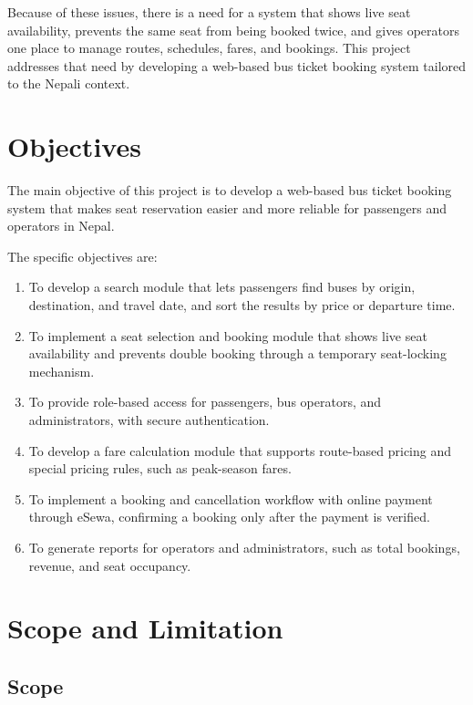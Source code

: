 Because of these issues, there is a need for a system that shows live seat availability, prevents the same seat from being booked twice, and gives operators one place to manage routes, schedules, fares, and bookings. This project addresses that need by developing a web-based bus ticket booking system tailored to the Nepali context.

\section{Objectives}

The main objective of this project is to develop a web-based bus ticket booking system that makes seat reservation easier and more reliable for passengers and operators in Nepal.

The specific objectives are:
\begin{enumerate}
  \item To develop a search module that lets passengers find buses by origin, destination, and travel date, and sort the results by price or departure time.
  \item To implement a seat selection and booking module that shows live seat availability and prevents double booking through a temporary seat-locking mechanism.
  \item To provide role-based access for passengers, bus operators, and administrators, with secure authentication.
  \item To develop a fare calculation module that supports route-based pricing and special pricing rules, such as peak-season fares.
  \item To implement a booking and cancellation workflow with online payment through eSewa, confirming a booking only after the payment is verified.
  \item To generate reports for operators and administrators, such as total bookings, revenue, and seat occupancy.
\end{enumerate}

\section{Scope and Limitation}

\subsection{Scope}


